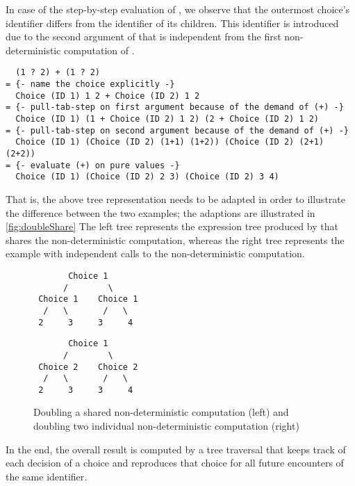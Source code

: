 In case of the step-by-step evaluation of , we observe that the outermost choice's identifier differs from the identifier of its children.
This identifier is introduced due to the second argument of \cyinl{(+)} that is independent from the first non-deterministic computation of .

\begin{verbatim}
  (1 ? 2) + (1 ? 2)
= {- name the choice explicitly -}
  Choice (ID 1) 1 2 + Choice (ID 2) 1 2
= {- pull-tab-step on first argument because of the demand of (+) -}
  Choice (ID 1) (1 + Choice (ID 2) 1 2) (2 + Choice (ID 2) 1 2)
= {- pull-tab-step on second argument because of the demand of (+) -}
  Choice (ID 1) (Choice (ID 2) (1+1) (1+2)) (Choice (ID 2) (2+1) (2+2))
= {- evaluate (+) on pure values -}
  Choice (ID 1) (Choice (ID 2) 2 3) (Choice (ID 2) 3 4)
\end{verbatim}

That is, the above tree representation needs to be adapted in order to illustrate the difference between the two examples; the adaptions are illustrated in \autoref{fig:doubleShare}
The left tree represents the expression tree produced by  that shares the non-deterministic computation, whereas the right tree represents the example  with independent calls to the non-deterministic computation.

\begin{figure}[t]
\begin{minipage}{0.49\textwidth}
\begin{verbatim}
       Choice 1
      /        \
 Choice 1    Choice 1
  /   \       /   \
 2     3     3     4
\end{verbatim}
\end{minipage}
\begin{minipage}{0.49\textwidth}
\begin{verbatim}
       Choice 1
      /        \
 Choice 2    Choice 2
  /   \       /   \
 2     3     3     4
\end{verbatim}
\end{minipage}
\caption{Doubling a shared non-deterministic computation (left) and doubling two
  individual non-deterministic computation (right)}
\label{fig:doubleShare}
\end{figure}

In the end, the overall result is computed by a tree traversal that keeps track of each decision of a choice and reproduces that choice for all future encounters of the same identifier.

